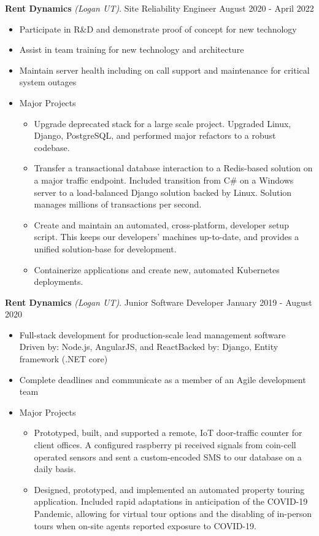 \documentclass[letterpaper,11pt]{article}
\begin{document}
\textbf{Rent Dynamics} \textit{(Logan UT)}. Site Reliability Engineer \hfill August 2020 - April 2022
\begin{itemize}[noitemsep,topsep=0pt]
	\item Participate in R\&D and demonstrate proof of concept for new technology
	\item Assist in team training for new technology and architecture
	\item Maintain server health including on call support and maintenance for critical system outages
	\item Major Projects \begin{itemize}[noitemsep, topsep=0pt]
		\item Upgrade deprecated stack for a large scale project. Upgraded Linux, Django, PostgreSQL, and performed major refactors to a robust codebase.
		\item Transfer a transactional database interaction to a Redis-based solution on a major traffic endpoint. Included transition from C\# on a Windows server to a load-balanced Django solution backed by Linux. Solution manages millions of transactions per second.
		\item Create and maintain an automated, cross-platform, developer setup script. This keeps our developers' machines up-to-date, and provides a unified solution-base for development.
		\item Containerize applications and create new, automated Kubernetes deployments.\\
	\end{itemize}
\end{itemize}

\textbf{Rent Dynamics} \textit{(Logan UT)}. Junior Software Developer \hfill January 2019 - August 2020
\begin{itemize}[noitemsep,topsep=0pt]
	\item Full-stack development for production-scale lead management software\\ Driven by: Node.js, AngularJS, and React\qquad\quad Backed by: Django, Entity framework (.NET core)
	\item Complete deadlines and communicate as a member of an Agile development team
	\item Major Projects \begin{itemize}[noitemsep, topsep=0pt]
		\item Prototyped, built, and supported a remote, IoT door-traffic counter for client offices. A configured raspberry pi received signals from coin-cell operated sensors and sent a custom-encoded SMS to our database on a daily basis.
		\item Designed, prototyped, and implemented an automated property touring application. Included rapid adaptations in anticipation of the COVID-19 Pandemic, allowing for virtual tour options and the disabling of in-person tours when on-site agents reported exposure to COVID-19.
	\end{itemize}
\end{itemize}
\end{document}
